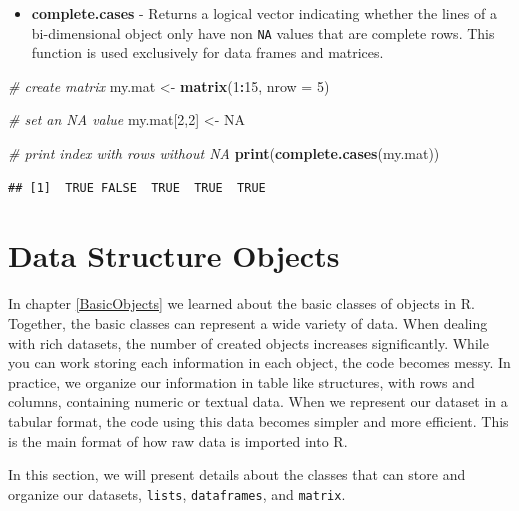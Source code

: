 \documentclass[11pt,]{book}
\newenvironment{Shaded}{\begin{snugshade}}{\end{snugshade}}
\newcommand{\KeywordTok}[1]{\textcolor[rgb]{0.27,0.27,0.27}{\textbf{#1}}}
\newcommand{\DataTypeTok}[1]{\textcolor[rgb]{0.27,0.27,0.27}{#1}}
\newcommand{\DecValTok}[1]{\textcolor[rgb]{0.06,0.06,0.06}{#1}}
\newcommand{\StringTok}[1]{\textcolor[rgb]{0.5,0.5,0.5}{#1}}
\newcommand{\CommentTok}[1]{\textcolor[rgb]{0.56,0.35,0.01}{\textit{#1}}}
\newcommand{\OtherTok}[1]{\textcolor[rgb]{0.56,0.35,0.01}{#1}}
\newcommand{\OperatorTok}[1]{\textcolor[rgb]{0.81,0.36,0.00}{\textbf{#1}}}
\newcommand{\NormalTok}[1]{#1}
\providecommand{\tightlist}{%
  \setlength{\itemsep}{0pt}\setlength{\parskip}{0pt}}
\begin{document}
\begin{itemize}
\tightlist
\item
  \textbf{complete.cases} - Returns a logical vector indicating whether
  the lines of a bi-dimensional object only have non \texttt{NA} values
  that are complete rows. This function is used exclusively for data
  frames and matrices. 
\end{itemize}

\begin{Shaded}
\begin{Highlighting}[]
\CommentTok{# create matrix}
\NormalTok{my.mat <-}\StringTok{ }\KeywordTok{matrix}\NormalTok{(}\DecValTok{1}\OperatorTok{:}\DecValTok{15}\NormalTok{, }\DataTypeTok{nrow =} \DecValTok{5}\NormalTok{)}

\CommentTok{# set an NA value}
\NormalTok{my.mat[}\DecValTok{2}\NormalTok{,}\DecValTok{2}\NormalTok{] <-}\StringTok{ }\OtherTok{NA}

\CommentTok{# print index with rows without NA}
\KeywordTok{print}\NormalTok{(}\KeywordTok{complete.cases}\NormalTok{(my.mat))}
\end{Highlighting}
\end{Shaded}

\begin{verbatim}
## [1]  TRUE FALSE  TRUE  TRUE  TRUE
\end{verbatim}

\hypertarget{DataStructureObjects}{\chapter{Data Structure
Objects}\label{DataStructureObjects}}

In chapter \ref{BasicObjects} we learned about the basic classes of
objects in R. Together, the basic classes can represent a wide variety
of data. When dealing with rich datasets, the number of created objects
increases significantly. While you can work storing each information in
each object, the code becomes messy. In practice, we organize our
information in table like structures, with rows and columns, containing
numeric or textual data. When we represent our dataset in a tabular
format, the code using this data becomes simpler and more efficient.
This is the main format of how raw data is imported into R.

In this section, we will present details about the classes that can
store and organize our datasets, \texttt{lists}, \texttt{dataframes},
and \texttt{matrix}.
\end{document}
